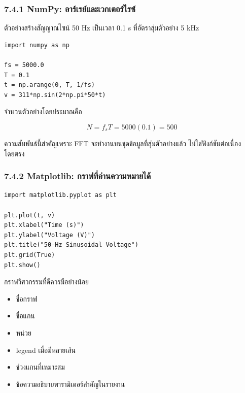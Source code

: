 \subsubsection{7.4.1 NumPy: อาร์เรย์และเวกเตอร์ไรซ์}

ตัวอย่างสร้างสัญญาณไซน์ 50 Hz เป็นเวลา 0.1 s ที่อัตราสุ่มตัวอย่าง 5 kHz

\begin{verbatim}
import numpy as np

fs = 5000.0
T = 0.1
t = np.arange(0, T, 1/fs)
v = 311*np.sin(2*np.pi*50*t)
\end{verbatim}

จำนวนตัวอย่างโดยประมาณคือ

\[
N=f_sT=5000(0.1)=500
\]

ความสัมพันธ์นี้สำคัญเพราะ FFT จะทำงานบนชุดข้อมูลที่สุ่มตัวอย่างแล้ว ไม่ใช่ฟังก์ชันต่อเนื่องโดยตรง

\subsubsection{7.4.2 Matplotlib: กราฟที่อ่านความหมายได้}

\begin{verbatim}
import matplotlib.pyplot as plt

plt.plot(t, v)
plt.xlabel("Time (s)")
plt.ylabel("Voltage (V)")
plt.title("50-Hz Sinusoidal Voltage")
plt.grid(True)
plt.show()
\end{verbatim}

กราฟวิศวกรรมที่ดีควรมีอย่างน้อย

\begin{itemize}
    \item ชื่อกราฟ
    \item ชื่อแกน
    \item หน่วย
    \item legend เมื่อมีหลายเส้น
    \item ช่วงแกนที่เหมาะสม
    \item ข้อความอธิบายพารามิเตอร์สำคัญในรายงาน
\end{itemize}


